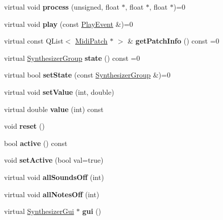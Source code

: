 \begin{DoxyCompactItemize}
virtual void {\bfseries process} (unsigned, float $\ast$, float $\ast$, float $\ast$)=0
\item 
\mbox{\label{class_ms_1_1_synthesizer_ab13152564aa024a7bf8385a44e697633}} 
virtual void {\bfseries play} (const \hyperlink{class_ms_1_1_play_event}{Play\+Event} \&)=0
\item 
\mbox{\label{class_ms_1_1_synthesizer_aca13e6f1f9d8994cd8c66e8d0c4c95a9}} 
virtual const Q\+List$<$ \hyperlink{struct_ms_1_1_midi_patch}{Midi\+Patch} $\ast$ $>$ \& {\bfseries get\+Patch\+Info} () const =0
\item 
\mbox{\label{class_ms_1_1_synthesizer_a1794f490f99b4e333bd75145986d51b4}} 
virtual \hyperlink{class_ms_1_1_synthesizer_group}{Synthesizer\+Group} {\bfseries state} () const =0
\item 
\mbox{\label{class_ms_1_1_synthesizer_a2ae475d66c1c500915fe304748e96013}} 
virtual bool {\bfseries set\+State} (const \hyperlink{class_ms_1_1_synthesizer_group}{Synthesizer\+Group} \&)=0
\item 
\mbox{\label{class_ms_1_1_synthesizer_acd7120fde084a24675bc379b23ad9d82}} 
virtual void {\bfseries set\+Value} (int, double)
\item 
\mbox{\label{class_ms_1_1_synthesizer_a8ac899662e2a1ba66d2e071e7db5bc39}} 
virtual double {\bfseries value} (int) const
\item 
\mbox{\label{class_ms_1_1_synthesizer_aa5975e5c1cd998e67af694117cfa7773}} 
void {\bfseries reset} ()
\item 
\mbox{\label{class_ms_1_1_synthesizer_a1489ca7e0be7e8a82c8f92d19446250a}} 
bool {\bfseries active} () const
\item 
\mbox{\label{class_ms_1_1_synthesizer_a1b8d4feb8b1497b09502c9141d99f60a}} 
void {\bfseries set\+Active} (bool val=true)
\item 
\mbox{\label{class_ms_1_1_synthesizer_a0c74a0991b16bb09bf99761389f0eafa}} 
virtual void {\bfseries all\+Sounds\+Off} (int)
\item 
\mbox{\label{class_ms_1_1_synthesizer_a6ca4320120f9591c10bb938cb961e10f}} 
virtual void {\bfseries all\+Notes\+Off} (int)
\item 
\mbox{\label{class_ms_1_1_synthesizer_a633213147959c6bbca8bf120386e2552}} 
virtual \hyperlink{class_ms_1_1_synthesizer_gui}{Synthesizer\+Gui} $\ast$ {\bfseries gui} ()
\end{DoxyCompactItemize}

